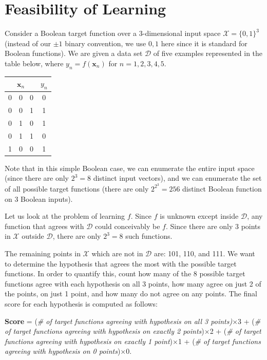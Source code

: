 \documentclass{article}
\begin{document}
\section{Feasibility of Learning}

Consider a Boolean target function over a 3-dimensional input space $\mathcal{X} = \{0, 1\}^3$ (instead of our $\pm1$ binary convention, we use $0, 1$ here since it is standard for Boolean functions). We are given a data set $\mathcal{D}$ of five examples represented in the table below, where $y_n = f(\mathbf{x}_n)$ for $n = 1, 2, 3, 4, 5$.

\begin{center}
	\begin{tabular}{ccc||c}
		\multicolumn{3}{c||}{$\mathbf{x}_n$} & $y_n$ \\ \hline
		0 & 0 & 0 & 0 \\
		0 & 0 & 1 & 1 \\
		0 & 1 & 0 & 1 \\
		0 & 1 & 1 & 0 \\
		1 & 0 & 0 & 1 
	\end{tabular}
\end{center}

Note that in this simple Boolean case, we can enumerate the entire input space (since there are only $2^3 = 8$ distinct input vectors), and we can enumerate the set of all possible target functions (there are only $2^{2^3} = 256$ distinct Boolean function on 3 Boolean inputs).

Let us look at the problem of learning $f$. Since $f$ is unknown except inside $\mathcal{D}$, any function that agrees with $\mathcal{D}$ could conceivably be $f$. Since there are only 3 points in $\mathcal{X}$ outside $\mathcal{D}$, there are only $2^3 = 8$ such functions.

The remaining points in $\mathcal{X}$ which are not in $\mathcal{D}$ are: 101, 110, and 111. We want to determine the hypothesis that agrees the most with the possible target functions. In order to quantify this, count how many of the 8 possible target functions agree with each hypothesis on all 3 points, how many agree on just 2 of the points, on just 1 point, and how many do not agree on any points. The final score for each hypothesis is computed as follows:

\textbf{Score} = (\emph{\# of target functions agreeing with hypothesis on all 3 points)}$\times$3 + (\textit{\# of target functions agreeing with hypothesis on exactly 2 points})$\times$2 + (\textit{\# of target functions agreeing with hypothesis on exactly 1 point})$\times$1 + (\textit{\# of target functions agreeing with hypothesis on 0 points})$\times$0.
\end{document}
